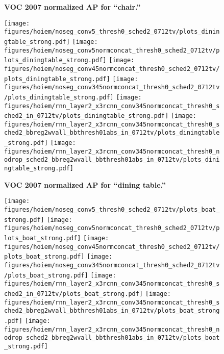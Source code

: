 \documentclass[10pt,twocolumn,letterpaper]{article}
\begin{document}
\begin{figure}[t]
\begin{center}
  \end{center}
  \vspace{-12pt}
  \caption{%
    \textbf{VOC 2007 normalized AP for ``chair.''}
  }
  \label{fig:hoiem}
\end{figure}\begin{figure}[t]
  \begin{center}
   \texttt{[image: figures/hoiem/noseg\_conv5\_thresh0\_sched2\_0712tv/plots\_diningtable\_strong.pdf]}
   \texttt{[image: figures/hoiem/noseg\_conv5normconcat\_thresh0\_sched2\_0712tv/plots\_diningtable\_strong.pdf]}
   \texttt{[image: figures/hoiem/noseg\_conv45normconcat\_thresh0\_sched2\_0712tv/plots\_diningtable\_strong.pdf]}
   \texttt{[image: figures/hoiem/noseg\_conv345normconcat\_thresh0\_sched2\_0712tv/plots\_diningtable\_strong.pdf]}
   \texttt{[image: figures/hoiem/rnn\_layer2\_x3rcnn\_conv345normconcat\_thresh0\_sched2\_in\_0712tv/plots\_diningtable\_strong.pdf]}
   \texttt{[image: figures/hoiem/rnn\_layer2\_x3rcnn\_conv345normconcat\_thresh0\_sched2\_bbreg2wvall\_bbthresh01abs\_in\_0712tv/plots\_diningtable\_strong.pdf]}
   \texttt{[image: figures/hoiem/rnn\_layer2\_x3rcnn\_conv345normconcat\_thresh0\_nodrop\_sched2\_bbreg2wvall\_bbthresh01abs\_in\_0712tv/plots\_diningtable\_strong.pdf]}
  \end{center}
  \vspace{-12pt}
  \caption{%
    \textbf{VOC 2007 normalized AP for ``dining table.''}
  }
  \label{fig:hoiem}
\end{figure}\begin{figure}[t]
  \begin{center}
   \texttt{[image: figures/hoiem/noseg\_conv5\_thresh0\_sched2\_0712tv/plots\_boat\_strong.pdf]}
   \texttt{[image: figures/hoiem/noseg\_conv5normconcat\_thresh0\_sched2\_0712tv/plots\_boat\_strong.pdf]}
   \texttt{[image: figures/hoiem/noseg\_conv45normconcat\_thresh0\_sched2\_0712tv/plots\_boat\_strong.pdf]}
   \texttt{[image: figures/hoiem/noseg\_conv345normconcat\_thresh0\_sched2\_0712tv/plots\_boat\_strong.pdf]}
   \texttt{[image: figures/hoiem/rnn\_layer2\_x3rcnn\_conv345normconcat\_thresh0\_sched2\_in\_0712tv/plots\_boat\_strong.pdf]}
   \texttt{[image: figures/hoiem/rnn\_layer2\_x3rcnn\_conv345normconcat\_thresh0\_sched2\_bbreg2wvall\_bbthresh01abs\_in\_0712tv/plots\_boat\_strong.pdf]}
   \texttt{[image: figures/hoiem/rnn\_layer2\_x3rcnn\_conv345normconcat\_thresh0\_nodrop\_sched2\_bbreg2wvall\_bbthresh01abs\_in\_0712tv/plots\_boat\_strong.pdf]}

\end{center}
\end{figure}
\end{document}
